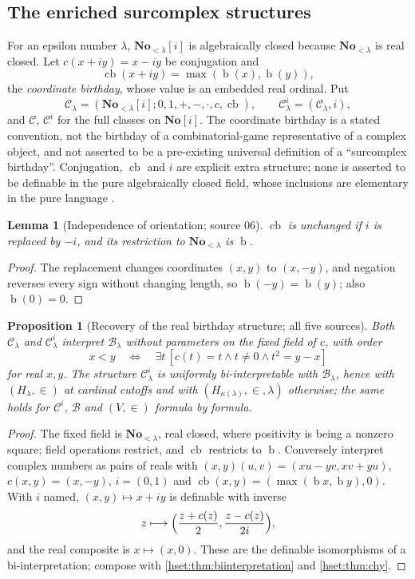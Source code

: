 \documentclass[11pt,letterpaper]{article}
\newtheorem{lemma}[lemma]{Lemma}\aliascntresetthe{lemma}
\newtheorem{proposition}[proposition]{Proposition}\aliascntresetthe{proposition}
\theoremstyle{definition}
\theoremstyle{remark}
\newcommand{\No}{\mathbf{No}}
\newcommand{\bd}{\operatorname{b}}
\newcommand{\B}{\mathcal B}
\newcommand{\C}{\mathcal C}
\newcommand{\cb}{\operatorname{cb}}
\begin{document}
\subsection{The enriched surcomplex structures}

For an epsilon number $\lambda$, $\No_{<\lambda}[i]$ is algebraically closed
because $\No_{<\lambda}$ is real closed. Let $c(x+iy)=x-iy$ be conjugation and
\[
 \cb(x+iy)=\max(\bd(x),\bd(y)),
\]
the \emph{coordinate birthday}, whose value is an embedded real ordinal. Put
\[
 \C_\lambda=(\No_{<\lambda}[i];0,1,+,-,\cdot,c,\cb),
 \qquad
 \C^i_\lambda=(\C_\lambda,i),
\]
and $\C$, $\C^i$ for the full classes on $\No[i]$. The coordinate birthday is a
stated convention, not the birthday of a combinatorial-game representative of a
complex object, and not asserted to be a pre-existing universal definition of a
``surcomplex birthday''. Conjugation, $\cb$ and $i$ are explicit extra
structure; none is asserted to be definable in the pure algebraically closed
field, whose inclusions are elementary in the pure language \cite{Marker}.

\begin{lemma}[Independence of orientation; source 06]
\label{hset:lem:cb-orientation}
$\cb$ is unchanged if $i$ is replaced by $-i$, and its restriction to
$\No_{<\lambda}$ is $\bd$.
\end{lemma}
\begin{proof}
The replacement changes coordinates $(x,y)$ to $(x,-y)$, and negation reverses
every sign without changing length, so $\bd(-y)=\bd(y)$; also $\bd(0)=0$.
\end{proof}

\begin{proposition}[Recovery of the real birthday structure; all five sources]
\label{hset:prop:real-recovery}
Both $\C_\lambda$ and $\C^i_\lambda$ interpret $\B_\lambda$ without parameters on
the fixed field of $c$, with order
\[
 x<y\quad\Longleftrightarrow\quad
 \exists t\,[c(t)=t\land t\ne0\land t^2=y-x]
\]
for real $x,y$. The structure $\C^i_\lambda$ is uniformly bi-interpretable with
$\B_\lambda$, hence with $(H_\lambda,\in)$ at cardinal cutoffs and with
$(H_{\kappa(\lambda)},\in,\lambda)$ otherwise; the same holds for $\C^i$, $\B$ and
$(V,\in)$ formula by formula.
\end{proposition}
\begin{proof}
The fixed field is $\No_{<\lambda}$, real closed, where positivity is being a
nonzero square; field operations restrict, and $\cb$ restricts to $\bd$.
Conversely interpret complex numbers as pairs of reals with
$(x,y)(u,v)=(xu-yv,xv+yu)$, $c(x,y)=(x,-y)$, $i=(0,1)$ and
$\cb(x,y)=(\max(\bd x,\bd y),0)$. With $i$ named, $(x,y)\mapsto x+iy$ is
definable with inverse
\[
 z\longmapsto\Bigl(\frac{z+c(z)}2,\frac{z-c(z)}{2i}\Bigr),
\]
and the real composite is $x\mapsto(x,0)$. These are the definable isomorphisms
of a bi-interpretation; compose with \cref{hset:thm:biinterpretation} and
\cref{hset:thm:chy}.
\end{proof}
\end{document}
